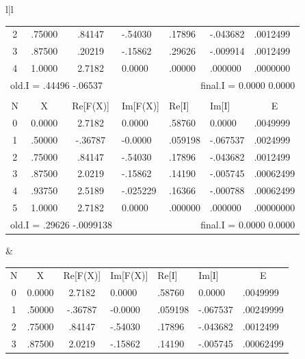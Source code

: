 \begin{figure}
\begin{tabular}{l|l}
\begin{tabular}{cccllll}
            2 & .75000 & .84147  & -.54030 & .17896  & -.043682 & .0012499 \\
            3 & .87500 & .20219  & -.15862 & .29626  & -.009914 & .0012499 \\
            4 & 1.0000 & 2.7182  & 0.0000  & .00000  &  .000000 & .0000000 \\
            \multicolumn{3}{l}{old.I = .44496 -.06537} & &
            \multicolumn{3}{r}{final.I = 0.0000 0.0000} \\
        \\
            \multicolumn{1}{c}{N}        & \multicolumn{1}{c}{X} &           \multicolumn{1}{c}{Re[F(X)]} & \multicolumn{1}{l}{Im[F(X)]} & 
            \multicolumn{1}{l}{Re[I]}    & \multicolumn{1}{l}{Im[I]} &
            \multicolumn{1}{c}{E} \\
            0 & 0.0000 & 2.7182  &  0.0000  & .58760  & 0.0000   & .0049999 \\
            1 & .50000 & -.36787 & -0.0000  & .059198 & -.067537 & .0024999 \\
            2 & .75000 & .84147  & -.54030  & .17896  & -.043682 & .0012499 \\
            3 & .87500 & 2.0219  & -.15862  & .14190  & -.005745 & .00062499 \\
            4 & .93750 & 2.5189  & -.025229 & .16366  & -.000788 & .00062499 \\
            5 & 1.0000 & 2.7182  & 0.0000   & .000000 &  .000000 & .00000000 \\
            \multicolumn{3}{l}{old.I = .29626 -.0099138} & &
            \multicolumn{3}{r}{final.I = 0.0000 0.0000} \\
        \end{tabular}
      &
        \begin{tabular}{cccllll}
            \multicolumn{1}{c}{N}        & \multicolumn{1}{c}{X} &           \multicolumn{1}{c}{Re[F(X)]} & \multicolumn{1}{l}{Im[F(X)]} & 
            \multicolumn{1}{l}{Re[I]}    & \multicolumn{1}{l}{Im[I]} &
            \multicolumn{1}{c}{E} \\
            0 & 0.0000 & 2.7182  &  0.0000   & .58760  & 0.0000    & .0049999 \\
            1 & .50000 & -.36787 & -0.0000   & .059198 & -.067537  & .00249999 \\
            2 & .75000 &  .84147 & -.54030   & .17896  & -.043682  & .0012499 \\
            3 & .87500 & 2.0219  & -.15862   & .14190  & -.005745  & .00062499 \\

\end{tabular}
\end{tabular}
\end{figure}
